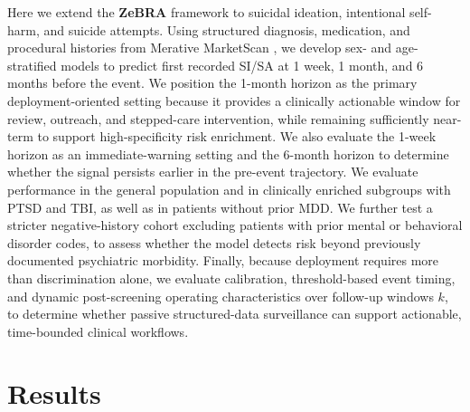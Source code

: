 \documentclass[onecolumn, compsoc,11pt]{IEEEtran}
\def\zebra{\textbf{ZeBRA}\xspace}
\def\zebra{\textbf{ZeBRA}\xspace}
\begin{document}
Here we extend the \zebra framework to suicidal ideation, intentional self-harm, and suicide attempts. Using structured diagnosis, medication, and procedural histories from Merative MarketScan \cite{hansen2017truven}, we develop sex- and age-stratified models to predict first recorded SI/SA at 1 week, 1 month, and 6 months before the event. We position the 1-month horizon as the primary deployment-oriented setting because it provides a clinically actionable window for review, outreach, and stepped-care intervention, while remaining sufficiently near-term to support high-specificity risk enrichment. We also evaluate the 1-week horizon as an immediate-warning setting and the 6-month horizon to determine whether the signal persists earlier in the pre-event trajectory. We evaluate performance in the general population and in clinically enriched subgroups with PTSD and TBI, as well as in patients without prior MDD. We further test a stricter negative-history cohort excluding patients with prior mental or behavioral disorder codes, to assess whether the model detects risk beyond previously documented psychiatric morbidity. Finally, because deployment requires more than discrimination alone, we evaluate calibration, threshold-based event timing, and dynamic post-screening operating characteristics over follow-up windows \(k\), to determine whether passive structured-data surveillance can support actionable, time-bounded clinical workflows.





\section*{Results}























\end{document}
